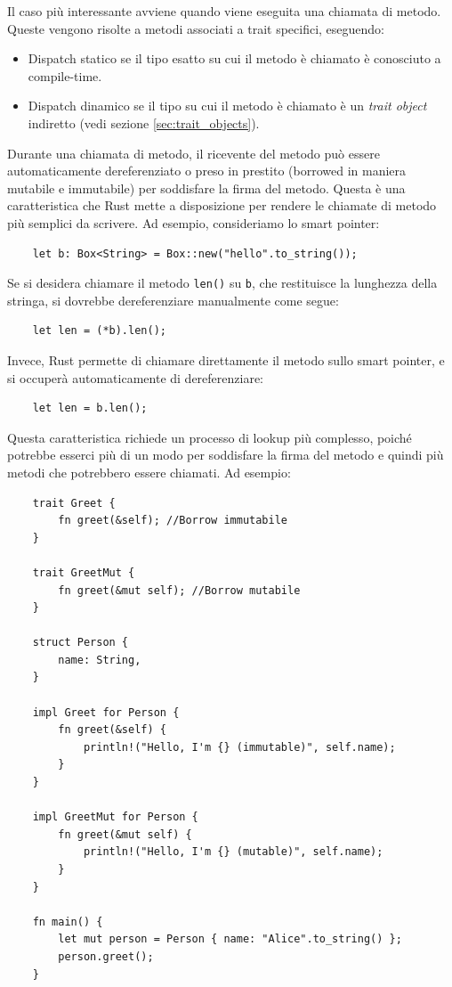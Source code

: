 Il caso più interessante avviene quando viene eseguita una chiamata di metodo. Queste vengono risolte a metodi associati a trait specifici, eseguendo:
\begin{itemize}
    \item Dispatch statico se il tipo esatto su cui il metodo è chiamato è conosciuto a compile-time.
    \item Dispatch dinamico se il tipo su cui il metodo è chiamato è un \textit{trait object} indiretto (vedi sezione \ref{sec:trait_objects}).
\end{itemize}
Durante una chiamata di metodo, il ricevente del metodo può essere automaticamente dereferenziato o preso in prestito (borrowed in maniera mutabile e immutabile) per soddisfare la firma del metodo. Questa è una caratteristica che Rust mette a disposizione per rendere le chiamate di metodo più semplici da scrivere. Ad esempio, consideriamo lo smart pointer:
\begin{verbatim}
    let b: Box<String> = Box::new("hello".to_string());
\end{verbatim}
Se si desidera chiamare il metodo \texttt{len()} su \texttt{b}, che restituisce la lunghezza della stringa, si dovrebbe dereferenziare manualmente come segue:
\begin{verbatim}
    let len = (*b).len();
\end{verbatim}
Invece, Rust permette di chiamare direttamente il metodo sullo smart pointer, e si occuperà automaticamente di dereferenziare:
\begin{verbatim}
    let len = b.len();
\end{verbatim}
Questa caratteristica richiede un processo di lookup più complesso, poiché potrebbe esserci più di un modo per soddisfare la firma del metodo e quindi più metodi che potrebbero essere chiamati. Ad esempio:
\begin{verbatim}
    trait Greet {
        fn greet(&self); //Borrow immutabile
    }

    trait GreetMut {
        fn greet(&mut self); //Borrow mutabile
    }

    struct Person {
        name: String,
    }

    impl Greet for Person {
        fn greet(&self) {
            println!("Hello, I'm {} (immutable)", self.name);
        }
    }

    impl GreetMut for Person {
        fn greet(&mut self) {
            println!("Hello, I'm {} (mutable)", self.name);
        }
    }

    fn main() {
        let mut person = Person { name: "Alice".to_string() };
        person.greet();
    }
\end{verbatim}

